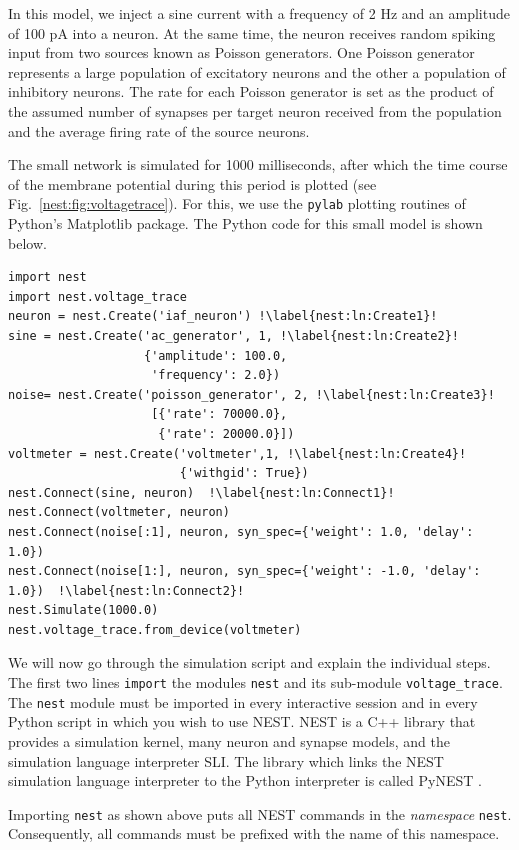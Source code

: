 \documentclass{article}
\begin{document}
In this model, we inject a sine current with a frequency of 2 Hz and
an amplitude of 100 pA into a neuron. At the same time, the neuron
receives random spiking input from two sources known as Poisson
generators. One Poisson generator represents a large population of
excitatory neurons and the other a population of inhibitory
neurons. The rate for each Poisson generator is set as the product of
the assumed number of synapses per target neuron received from the 
population and the average firing rate of the source neurons.

The small network is simulated for 1000 milliseconds, after which the
time course of the membrane potential during this period is plotted
(see Fig.~\ref{nest:fig:voltagetrace}). For this, we use the
\lstinline!pylab! plotting routines of Python's Matplotlib package.
The Python code for this small model is shown below.

\begin{lstlisting}
import nest
import nest.voltage_trace
neuron = nest.Create('iaf_neuron') !\label{nest:ln:Create1}!
sine = nest.Create('ac_generator', 1, !\label{nest:ln:Create2}!
                   {'amplitude': 100.0,
                    'frequency': 2.0})
noise= nest.Create('poisson_generator', 2, !\label{nest:ln:Create3}!
                    [{'rate': 70000.0}, 
                     {'rate': 20000.0}])
voltmeter = nest.Create('voltmeter',1, !\label{nest:ln:Create4}!
                        {'withgid': True})
nest.Connect(sine, neuron)  !\label{nest:ln:Connect1}!
nest.Connect(voltmeter, neuron)
nest.Connect(noise[:1], neuron, syn_spec={'weight': 1.0, 'delay': 1.0}) 
nest.Connect(noise[1:], neuron, syn_spec={'weight': -1.0, 'delay': 1.0})  !\label{nest:ln:Connect2}!
nest.Simulate(1000.0)
nest.voltage_trace.from_device(voltmeter)
\end{lstlisting}
We will now go through the simulation script and explain the
individual steps. The first two lines \lstinline!import! the modules
\lstinline!nest!  and its sub-module \lstinline!voltage_trace!. The
\lstinline!nest!  module must be imported in every interactive session
and in every Python script in which you wish to use NEST. NEST is a
C++ library that provides a simulation kernel, many neuron and synapse
models, and the simulation language interpreter SLI. The library which
links the NEST simulation language interpreter to the Python
interpreter is called PyNEST \citep{Eppler09_12}. 

Importing \lstinline!nest! as shown above puts all NEST commands in
the \emph{namespace} \lstinline!nest!. Consequently, all commands must
be prefixed with the name of this namespace.
 
\end{document}
